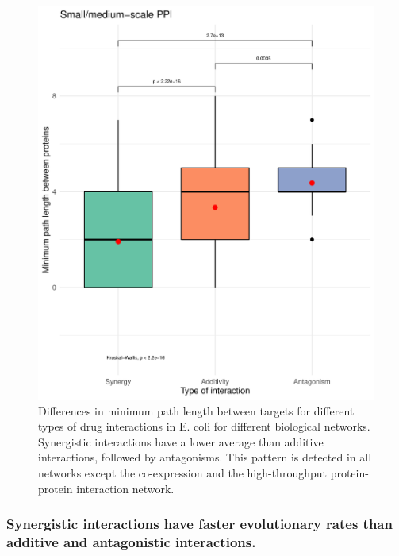 \documentclass[
]{article}
\begin{document}
\begin{figure}
\includegraphics[width=1\linewidth]{Fig3} \caption{Differences in minimum path length between targets for different types of drug interactions in E. coli for different biological networks. Synergistic interactions have a lower average than additive interactions, followed by antagonisms. This pattern is detected in all networks except the co-expression and the high-throughput protein-protein interaction network.}\label{fig:fig3}
\end{figure}

\hypertarget{synergistic-interactions-have-faster-evolutionary-rates-than-additive-and-antagonistic-interactions.}{%
\subsubsection{Synergistic interactions have faster evolutionary rates than additive and antagonistic interactions.}\label{synergistic-interactions-have-faster-evolutionary-rates-than-additive-and-antagonistic-interactions.}}
\end{document}
